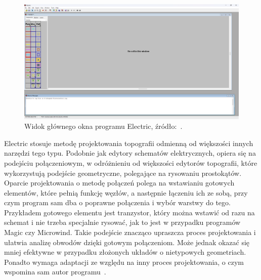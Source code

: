 \begin{figure}[h]
    \centering
    \includegraphics[width=.9\textwidth]{chapters/chapter2/img/electric_okno}
    \caption[Widok głównego okna programu Electric.]{Widok głównego okna programu Electric, źródło:~\cite{electric_sfs}.}
    \label{fig:electric_okno}
\end{figure}
\indent Electric stosuje metodę projektowania topografii odmienną od większości innych narzędzi tego typu.
Podobnie jak edytory schematów elektrycznych, opiera się na podejściu połączeniowym,
w odróżnieniu od większości edytorów topografii, które wykorzystują podejście geometryczne,
polegające na rysowaniu prostokątów.
Oparcie projektowania o metodę połączeń polega na wstawianiu gotowych elementów,
które pełnią funkcję węzłów, %
a następnie łączeniu ich ze sobą, przy czym program sam dba o poprawne połączenia i wybór warstwy do tego.
Przykładem gotowego elementu jest tranzystor,
który można wstawić od razu na schemat
i nie trzeba specjalnie rysować, jak to jest w przypadku programów Magic czy Microwind.
Takie podejście znacząco upraszcza proces projektowania i ułatwia analizę obwodów dzięki gotowym połączeniom.
Może jednak okazać się mniej efektywne w przypadku złożonych układów o nietypowych geometriach.
Ponadto wymaga adaptacji ze względu na inny proces projektowania,
o czym wspomina sam autor programu~\cite{electric_computer_aids}.\\
